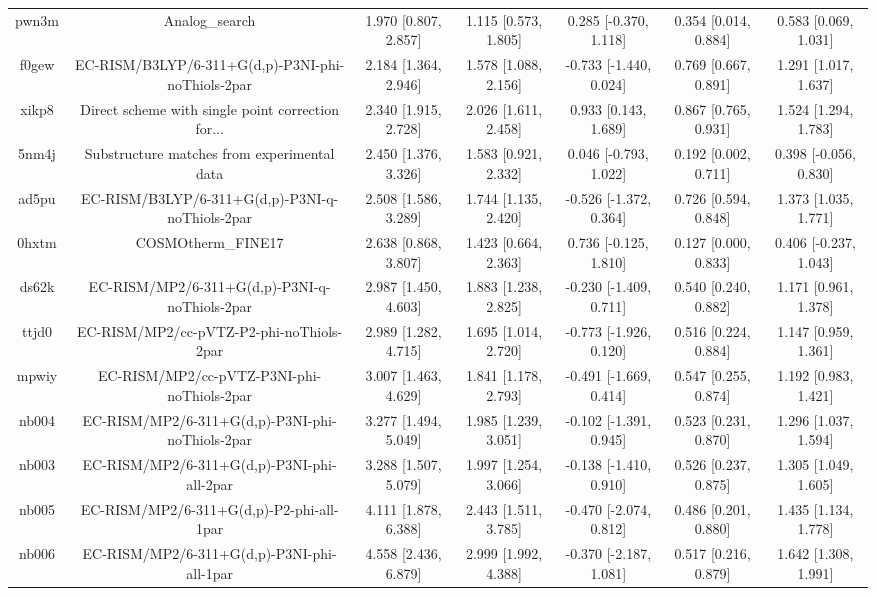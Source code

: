 \documentclass{article}
\begin{document}
\begin{center}
\begin{longtable}{|ccccccc|}
 pwn3m &                                     Analog\_search &  1.970 [0.807, 2.857] &  1.115 [0.573, 1.805] &    0.285 [-0.370, 1.118] &  0.354 [0.014, 0.884] &   0.583 [0.069, 1.031] \\
 f0gew &  EC-RISM/B3LYP/6-311+G(d,p)-P3NI-phi-noThiols-2par &  2.184 [1.364, 2.946] &  1.578 [1.088, 2.156] &   -0.733 [-1.440, 0.024] &  0.769 [0.667, 0.891] &   1.291 [1.017, 1.637] \\
 xikp8 &  Direct scheme with single point correction for... &  2.340 [1.915, 2.728] &  2.026 [1.611, 2.458] &     0.933 [0.143, 1.689] &  0.867 [0.765, 0.931] &   1.524 [1.294, 1.783] \\
 5nm4j &        Substructure matches from experimental data &  2.450 [1.376, 3.326] &  1.583 [0.921, 2.332] &    0.046 [-0.793, 1.022] &  0.192 [0.002, 0.711] &  0.398 [-0.056, 0.830] \\
 ad5pu &    EC-RISM/B3LYP/6-311+G(d,p)-P3NI-q-noThiols-2par &  2.508 [1.586, 3.289] &  1.744 [1.135, 2.420] &   -0.526 [-1.372, 0.364] &  0.726 [0.594, 0.848] &   1.373 [1.035, 1.771] \\
 0hxtm &                                 COSMOtherm\_FINE17 &  2.638 [0.868, 3.807] &  1.423 [0.664, 2.363] &    0.736 [-0.125, 1.810] &  0.127 [0.000, 0.833] &  0.406 [-0.237, 1.043] \\
 ds62k &      EC-RISM/MP2/6-311+G(d,p)-P3NI-q-noThiols-2par &  2.987 [1.450, 4.603] &  1.883 [1.238, 2.825] &   -0.230 [-1.409, 0.711] &  0.540 [0.240, 0.882] &   1.171 [0.961, 1.378] \\
 ttjd0 &           EC-RISM/MP2/cc-pVTZ-P2-phi-noThiols-2par &  2.989 [1.282, 4.715] &  1.695 [1.014, 2.720] &   -0.773 [-1.926, 0.120] &  0.516 [0.224, 0.884] &   1.147 [0.959, 1.361] \\
 mpwiy &         EC-RISM/MP2/cc-pVTZ-P3NI-phi-noThiols-2par &  3.007 [1.463, 4.629] &  1.841 [1.178, 2.793] &   -0.491 [-1.669, 0.414] &  0.547 [0.255, 0.874] &   1.192 [0.983, 1.421] \\
 nb004 &    EC-RISM/MP2/6-311+G(d,p)-P3NI-phi-noThiols-2par &  3.277 [1.494, 5.049] &  1.985 [1.239, 3.051] &   -0.102 [-1.391, 0.945] &  0.523 [0.231, 0.870] &   1.296 [1.037, 1.594] \\
 nb003 &         EC-RISM/MP2/6-311+G(d,p)-P3NI-phi-all-2par &  3.288 [1.507, 5.079] &  1.997 [1.254, 3.066] &   -0.138 [-1.410, 0.910] &  0.526 [0.237, 0.875] &   1.305 [1.049, 1.605] \\
 nb005 &           EC-RISM/MP2/6-311+G(d,p)-P2-phi-all-1par &  4.111 [1.878, 6.388] &  2.443 [1.511, 3.785] &   -0.470 [-2.074, 0.812] &  0.486 [0.201, 0.880] &   1.435 [1.134, 1.778] \\
 nb006 &         EC-RISM/MP2/6-311+G(d,p)-P3NI-phi-all-1par &  4.558 [2.436, 6.879] &  2.999 [1.992, 4.388] &   -0.370 [-2.187, 1.081] &  0.517 [0.216, 0.879] &   1.642 [1.308, 1.991] \\
\end{longtable}
\end{center}
\end{document}
